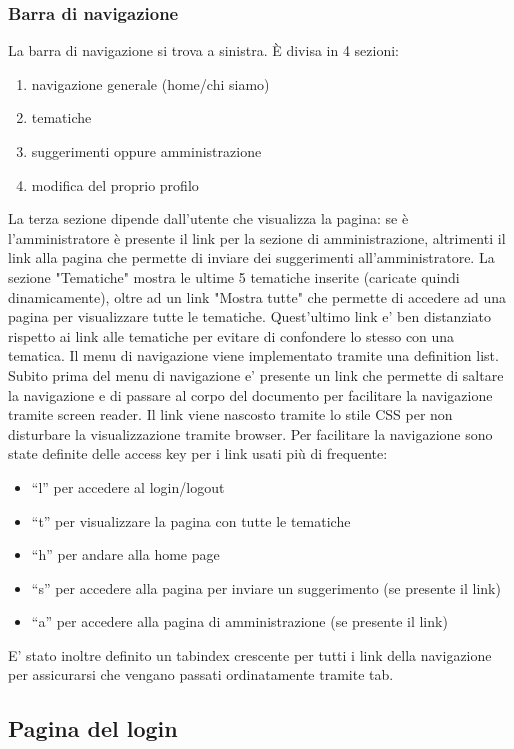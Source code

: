 \documentclass[a4paper,10pt]{article}
\begin{document}
\subsubsection{Barra di navigazione}
La barra di navigazione si trova a sinistra. \`E divisa in 4 sezioni:
\begin{enumerate}
 \item navigazione generale (home/chi siamo)
 \item tematiche
 \item suggerimenti oppure amministrazione
 \item modifica del proprio profilo
\end{enumerate}
La terza sezione dipende dall'utente che visualizza la pagina: se \`e l'amministratore \`e presente il link per la sezione di amministrazione, altrimenti il link alla pagina che permette di inviare dei suggerimenti all'amministratore.
La sezione "Tematiche" mostra le ultime 5 tematiche inserite (caricate quindi dinamicamente), oltre ad un link "Mostra tutte" che permette di accedere ad una pagina per visualizzare tutte le tematiche. Quest'ultimo link e' ben distanziato rispetto ai link alle tematiche per evitare di confondere lo stesso con una tematica.
Il menu di navigazione viene implementato tramite una definition list.
Subito prima del menu di navigazione e' presente un link che permette di saltare la navigazione e di passare al corpo del documento per facilitare la navigazione tramite screen reader. Il link viene nascosto tramite lo stile CSS per non disturbare la visualizzazione tramite browser.
Per facilitare la navigazione sono state definite delle access key per i link usati pi\`u di frequente:
\begin{itemize}
 \item ``l'' per accedere al login/logout
 \item ``t'' per visualizzare la pagina con tutte le tematiche
 \item ``h'' per andare alla home page
 \item ``s'' per accedere alla pagina per inviare un suggerimento (se presente il link)
 \item ``a'' per accedere alla pagina di amministrazione (se presente il link)
\end{itemize}
E' stato inoltre definito un tabindex crescente per tutti i link della navigazione per assicurarsi che vengano passati ordinatamente tramite tab.

\subsection{Pagina del login}
\end{document}
